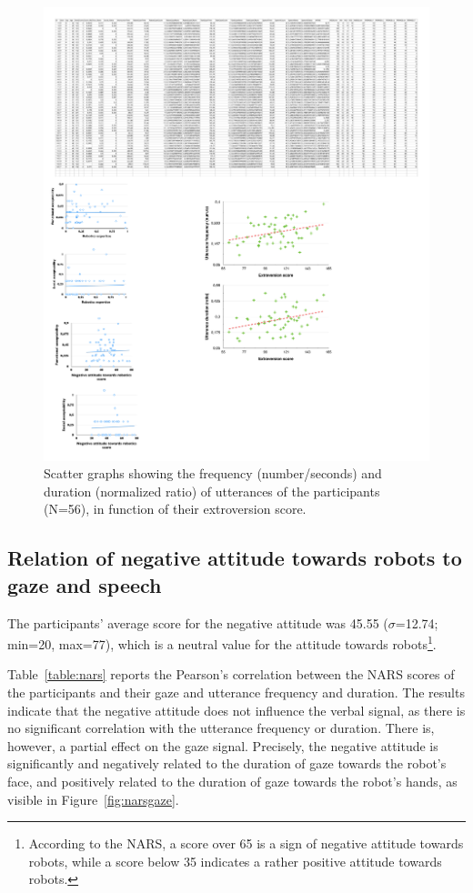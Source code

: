 \documentclass[twocolumn]{svjour3}          %
\begin{document}
\begin{figure}
\centering
\includegraphics[width=0.99\hsize]{figures/plots_extraversion_utterance_3.pdf}
\caption{Scatter graphs showing the frequency (number/seconds) and duration (normalized ratio) of utterances of the participants (N=56), in function of their extroversion score.}
\label{fig:extroversionutterance}
\end{figure}


\subsection{Relation of negative attitude towards robots to gaze and speech}\label{sec:nars}

The participants' average score for the negative attitude was 45.55 ($\sigma$=12.74; min=20, max=77), which is a neutral value for the attitude towards robots\footnote{According to the NARS, a score over 65 is a sign of negative attitude towards robots, while a score below 35 indicates a rather positive attitude towards robots.}. 

Table~\ref{table:nars} reports the Pearson's correlation between the NARS scores of the participants and their gaze and utterance frequency and duration. The results indicate that the negative attitude does not influence the verbal signal, as there is no significant correlation with the utterance frequency or duration. 
There is, however, a partial effect on the gaze signal. Precisely, the negative attitude is significantly and negatively related to the duration of gaze towards the robot's face, and positively related to the duration of gaze towards the robot's hands, as visible in Figure~\ref{fig:narsgaze}. 
\end{document}

